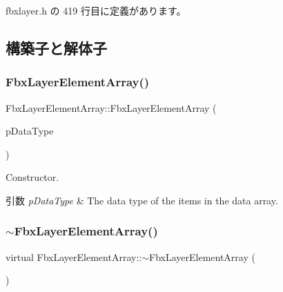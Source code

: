 fbxlayer.\+h の 419 行目に定義があります。



\subsection{構築子と解体子}
\mbox{\label{class_fbx_layer_element_array_a99815649c1cf07a8d1446a0e086e3871}} 
\subsubsection{\texorpdfstring{Fbx\+Layer\+Element\+Array()}{FbxLayerElementArray()}}
{\footnotesize\ttfamily Fbx\+Layer\+Element\+Array\+::\+Fbx\+Layer\+Element\+Array (\begin{DoxyParamCaption}\item[{\hyperlink{fbxpropertytypes_8h_a73913a5ddfb20e57c6f25e9e6784bd92}{E\+Fbx\+Type}}]{p\+Data\+Type }\end{DoxyParamCaption})}

Constructor. 
\begin{DoxyParams}{引数}
{\em p\+Data\+Type} & The data type of the items in the data array. \\
\hline
\end{DoxyParams}
\mbox{\label{class_fbx_layer_element_array_abee3841f66f7d668f113c728a93dd26d}} 
\subsubsection{\texorpdfstring{$\sim$\+Fbx\+Layer\+Element\+Array()}{~FbxLayerElementArray()}}
{\footnotesize\ttfamily virtual Fbx\+Layer\+Element\+Array\+::$\sim$\+Fbx\+Layer\+Element\+Array (\begin{DoxyParamCaption}{ }\end{DoxyParamCaption})\hspace{0.3cm}{\ttfamily [virtual]}}



